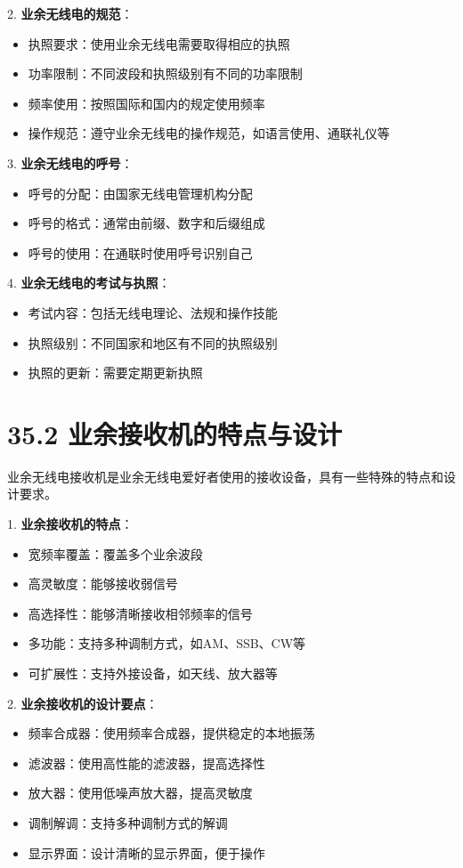 \documentclass[12pt,UTF8]{ctexbook}
\begin{document}
2. \textbf{业余无线电的规范}：
   \begin{itemize}[leftmargin=3.5em]
   \item 执照要求：使用业余无线电需要取得相应的执照
   \item 功率限制：不同波段和执照级别有不同的功率限制
   \item 频率使用：按照国际和国内的规定使用频率
   \item 操作规范：遵守业余无线电的操作规范，如语言使用、通联礼仪等
   \end{itemize}

3. \textbf{业余无线电的呼号}：
   \begin{itemize}[leftmargin=3.5em]
   \item 呼号的分配：由国家无线电管理机构分配
   \item 呼号的格式：通常由前缀、数字和后缀组成
   \item 呼号的使用：在通联时使用呼号识别自己
   \end{itemize}

4. \textbf{业余无线电的考试与执照}：
   \begin{itemize}[leftmargin=3.5em]
   \item 考试内容：包括无线电理论、法规和操作技能
   \item 执照级别：不同国家和地区有不同的执照级别
   \item 执照的更新：需要定期更新执照
   \end{itemize}

\section*{35.2 业余接收机的特点与设计}

业余无线电接收机是业余无线电爱好者使用的接收设备，具有一些特殊的特点和设计要求。

1. \textbf{业余接收机的特点}：
   \begin{itemize}[leftmargin=3.5em]
   \item 宽频率覆盖：覆盖多个业余波段
   \item 高灵敏度：能够接收弱信号
   \item 高选择性：能够清晰接收相邻频率的信号
   \item 多功能：支持多种调制方式，如AM、SSB、CW等
   \item 可扩展性：支持外接设备，如天线、放大器等
   \end{itemize}

2. \textbf{业余接收机的设计要点}：
   \begin{itemize}[leftmargin=3.5em]
   \item 频率合成器：使用频率合成器，提供稳定的本地振荡
   \item 滤波器：使用高性能的滤波器，提高选择性
   \item 放大器：使用低噪声放大器，提高灵敏度
   \item 调制解调：支持多种调制方式的解调
   \item 显示界面：设计清晰的显示界面，便于操作
   \end{itemize}
\end{document}
